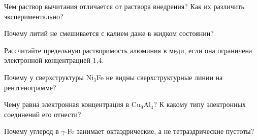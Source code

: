 \begin{proverka}
\item Чем раствор вычитания отличается от раствора внедрения? Как их
различить экспериментально?
\item Почему литий не смешивается с калием даже в жидком состоянии?
\item Рассчитайте предельную растворимость алюминия в меди, если она
ограничена электронной концентрацией 1,4.
\item Почему у сверхструктуры Ni$_3$Fe не видны сверхструктурные линии на
рентгенограмме?
\item Чему равна электронная концентрация в Cu$_9$Al$_4$? К какому типу
электронных соединений его отнести?
\item Почему углерод в $\gamma$-Fe занимает октаэдрические, а не
тетраэдрические пустоты?
\end{proverka}
